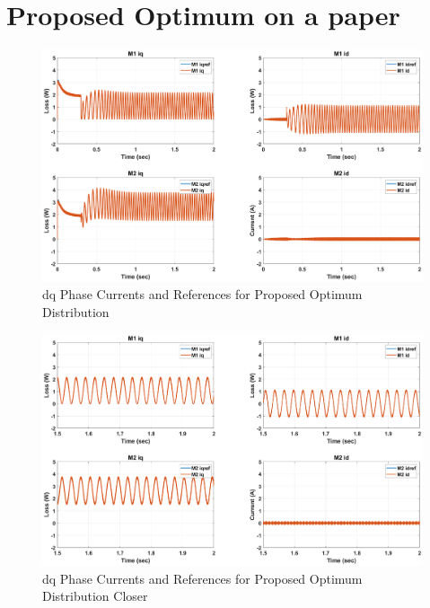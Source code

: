 \documentclass{article}
\begin{document}
\section{Proposed Optimum on a paper}
\begin{figure}[H]
\centering
\includegraphics[scale=0.35]{SimulationResults/ProposedOptimum/idq_refs.eps}
\caption{dq Phase Currents and References for Proposed Optimum Distribution}
\label{fig:PhaseCurrentsReferencesProposedOptimum}
\end{figure}

\begin{figure}[H]
\centering
\includegraphics[scale=0.35]{SimulationResults/ProposedOptimum/idq_refs_closer.eps}
\caption{dq Phase Currents and References for Proposed Optimum Distribution Closer}
\label{fig:PhaseCurrentsReferencesProposedOptimumCloser}
\end{figure}
\end{document}

